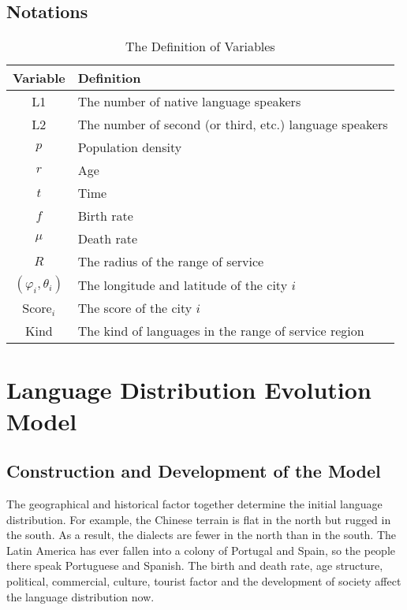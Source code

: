 \documentclass{mcmthesis}
\begin{document}
\subsection{Notations}
\begin{table}[htbp]
\centering
\caption{The Definition of Variables}
\begin{tabular}{|c|l|}
\hline
Variable&Definition\\
\hline
L1&The number of native language speakers\\
\hline
L2&The number of second (or third, etc.) language speakers\\
\hline
\(p\)&Population density\\
\hline
\(r\)&Age\\
\hline
\(t\)&Time\\
\hline
\(f\)&Birth rate\\
\hline
\(\mu\)&Death rate\\
\hline
\(R\)&The radius of the range of service\\
\hline
\((\varphi_i, \theta_i)\)&The longitude and latitude of the city \(i\)\\
\hline
Score\(_i\)&The score of the city \(i\)\\
\hline
Kind&The kind of languages in the range of service region\\
\hline
\end{tabular}
\end{table}

\section{Language Distribution Evolution Model}
\subsection{Construction and Development of the Model}
The geographical and historical factor together determine the initial language distribution. For example, the Chinese terrain is flat in the north but rugged in the south. As a result, the dialects are fewer in the north than in the south. The Latin America has ever fallen into a colony of Portugal and Spain, so the people there speak Portuguese and Spanish. The birth and death rate, age structure, political, commercial, culture, tourist factor and the development of society affect the language distribution now. 
\end{document}
